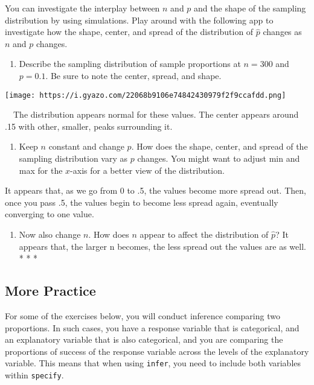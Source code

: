 \documentclass[
]{article}
\providecommand{\tightlist}{%
  \setlength{\itemsep}{0pt}\setlength{\parskip}{0pt}}
\begin{document}
You can investigate the interplay between \(n\) and \(p\) and the shape
of the sampling distribution by using simulations. Play around with the
following app to investigate how the shape, center, and spread of the
distribution of \(\hat{p}\) changes as \(n\) and \(p\) changes.

\begin{enumerate}
\def\labelenumi{\arabic{enumi}.}
\setcounter{enumi}{5}
\tightlist
\item
  Describe the sampling distribution of sample proportions at
  \(n = 300\) and \(p = 0.1\). Be sure to note the center, spread, and
  shape.
\end{enumerate}

\texttt{[image: https://i.gyazo.com/22068b9106e74842430979f2f9ccafdd.png]}

~~The distribution appears normal for these values. The center appears
around .15 with other, smaller, peaks surrounding it.

\begin{enumerate}
\def\labelenumi{\arabic{enumi}.}
\setcounter{enumi}{6}
\tightlist
\item
  Keep \(n\) constant and change \(p\). How does the shape, center, and
  spread of the sampling distribution vary as \(p\) changes. You might
  want to adjust min and max for the \(x\)-axis for a better view of the
  distribution.
\end{enumerate}

It appears that, as we go from 0 to .5, the values become more spread
out. Then, once you pass .5, the values begin to become less spread
again, eventually converging to one value.

\begin{enumerate}
\def\labelenumi{\arabic{enumi}.}
\setcounter{enumi}{7}
\tightlist
\item
  Now also change \(n\). How does \(n\) appear to affect the
  distribution of \(\hat{p}\)? \textbar{} It appears that, the larger n
  becomes, the less spread out the values are as well. * * *
\end{enumerate}

\hypertarget{more-practice}{%
\subsection{More Practice}\label{more-practice}}

For some of the exercises below, you will conduct inference comparing
two proportions. In such cases, you have a response variable that is
categorical, and an explanatory variable that is also categorical, and
you are comparing the proportions of success of the response variable
across the levels of the explanatory variable. This means that when
using \texttt{infer}, you need to include both variables within
\texttt{specify}.
\end{document}
